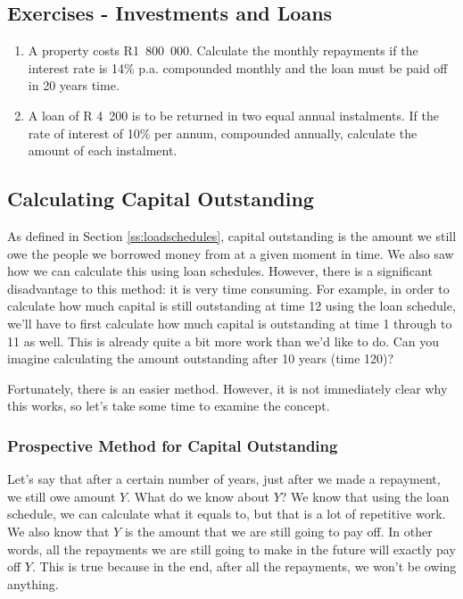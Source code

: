 \subsection{Exercises - Investments and Loans}
\begin{enumerate}
\item{A property costs R1~800~000.  Calculate the monthly repayments if the interest rate is 14\% p.a. compounded monthly and the loan must be paid off in 20 years time.}
\item{A loan of R 4~200 is to be returned in two equal annual instalments.  If the rate of interest of 10\% per annum, compounded annually, calculate the amount of each instalment.}
\end{enumerate}


\subsection{Calculating Capital Outstanding}
\label{ss:capitaloutstanding}

As defined in Section \ref{ss:loadschedules}, capital outstanding is the amount we still owe the people we borrowed money from at a given moment in time. We also saw how we can calculate this using loan schedules. However, there is a significant disadvantage to this method: it is very time consuming. For example, in order to calculate how much capital is still outstanding at time 12 using the loan schedule, we'll have to first calculate how much capital is outstanding at time 1 through to 11 as well. This is already quite a bit more work than we'd like to do. Can you imagine calculating the amount outstanding after 10 years (time 120)?

Fortunately, there is an easier method. However, it is not immediately clear why this works, so let's take some time to examine the concept.

\subsubsection{Prospective Method for Capital Outstanding}

Let's say that after a certain number of years, just after we made a repayment, we still owe amount $Y$. What do we know about $Y$? We know that using the loan schedule, we can calculate what it equals to, but that is a lot of repetitive work. We also know that $Y$ is the amount that we are still going to pay off. In other words, all the repayments we are still going to make in the future will exactly pay off $Y$. This is true because in the end, after all the repayments, we won't be owing anything.

